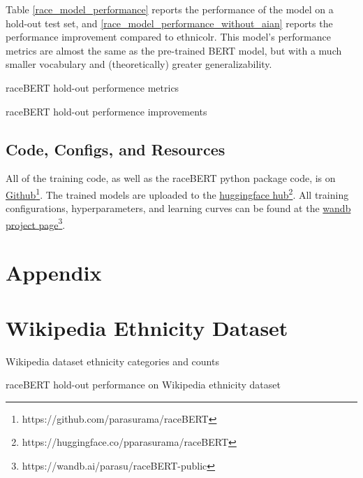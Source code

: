 \documentclass[11pt]{article}
\begin{document}
Table \ref{race_model_performance} reports the performance of the model on a hold-out test set, and \autoref{race_model_performance_without_aian} reports the performance improvement compared to ethnicolr.
This model's performance metrics are almost the same as the pre-trained BERT model, but with a much smaller vocabulary and (theoretically) greater generalizability.

\begin{table}[H]
 \centering
 
 \label{race_model_performance}
 \caption{raceBERT hold-out performence metrics}
\end{table}

\begin{table}[H]
 \centering
 
 \label{race_model_performance_without_aian}
 \caption{raceBERT hold-out performence improvements}
\end{table}


\subsection{Code, Configs, and Resources}
All of the training code, as well as the raceBERT python package code, is on \href{https://github.com/parasurama/raceBERT}{Github}\footnote{https://github.com/parasurama/raceBERT}.
The trained models are uploaded to the \href{https://huggingface.co/pparasurama/raceBERT}{huggingface hub}\footnote{https://huggingface.co/pparasurama/raceBERT}.
All training configurations, hyperparameters, and learning curves can be found at the \href{https://wandb.ai/parasu/raceBERT-public}{wandb project page}\footnote{https://wandb.ai/parasu/raceBERT-public}.

\pagebreak

\printbibliography

\pagebreak

\section*{Appendix}
\appendix

\section{Wikipedia Ethnicity Dataset}

\begin{table}[H]
 \centering
 
 \label{tab:ethnicity_counts}
 \caption{Wikipedia dataset ethnicity categories and counts}
\end{table}

\begin{table}[H]
 \centering
 \scalebox{0.8}{}
 \label{tab:ethnicty_performance}
 \caption{raceBERT hold-out performance on Wikipedia ethnicity dataset}
\end{table}
\end{document}
